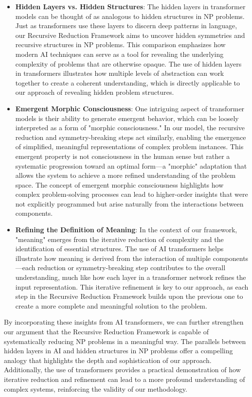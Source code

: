 \documentclass{article}
\begin{document}
\begin{itemize}
\item \textbf{Hidden Layers vs. Hidden Structures}: The hidden layers in transformer models can be thought of as analogous to hidden structures in NP problems. Just as transformers use these layers to discern deep patterns in language, our Recursive Reduction Framework aims to uncover hidden symmetries and recursive structures in NP problems. This comparison emphasizes how modern AI techniques can serve as a tool for revealing the underlying complexity of problems that are otherwise opaque. The use of hidden layers in transformers illustrates how multiple levels of abstraction can work together to create a coherent understanding, which is directly applicable to our approach of revealing hidden problem structures.
\item \textbf{Emergent Morphic Consciousness}: One intriguing aspect of transformer models is their ability to generate emergent behavior, which can be loosely interpreted as a form of "morphic consciousness." In our model, the recursive reduction and symmetry-breaking steps act similarly, enabling the emergence of simplified, meaningful representations of complex problem instances. This emergent property is not consciousness in the human sense but rather a systematic progression toward an optimal form---a "morphic" adaptation that allows the system to achieve a more refined understanding of the problem space. The concept of emergent morphic consciousness highlights how complex problem-solving processes can lead to higher-order insights that were not explicitly programmed but arise naturally from the interactions between components.
\item \textbf{Refining the Definition of Meaning}: In the context of our framework, "meaning" emerges from the iterative reduction of complexity and the identification of essential structures. The use of AI transformers helps illustrate how meaning is derived from the interaction of multiple components---each reduction or symmetry-breaking step contributes to the overall understanding, much like how each layer in a transformer network refines the input representation. This iterative refinement is key to our approach, as each step in the Recursive Reduction Framework builds upon the previous one to create a more complete and meaningful solution to the problem.
\end{itemize}

By incorporating these insights from AI transformers, we can further strengthen our argument that the Recursive Reduction Framework is capable of systematically reducing NP problems in a meaningful way. The parallels between hidden layers in AI and hidden structures in NP problems offer a compelling analogy that highlights the depth and sophistication of our approach. Additionally, the use of transformers provides a practical demonstration of how iterative reduction and refinement can lead to a more profound understanding of complex systems, reinforcing the validity of our methodology.
\end{document}
